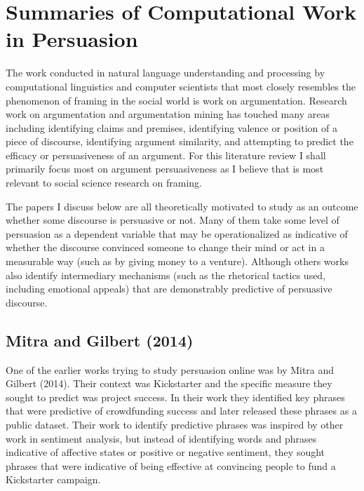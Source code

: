 \documentclass[11pt,a4paper]{article}
\begin{document}
\section{Summaries of Computational Work in Persuasion}

The work conducted in natural language understanding and processing by computational linguistics and computer scientists that most closely resembles the phenomenon of framing in the social world is work on argumentation. Research work on argumentation and argumentation mining has touched many areas including identifying claims and premises, identifying valence or position of a piece of discourse, identifying argument similarity, and attempting to predict the efficacy or persuasiveness of an argument. For this literature review I shall primarily focus most on argument persuasiveness as I believe that is most relevant to social science research on framing. 

The papers I discuss below are all theoretically motivated to study as an outcome whether some discourse is persuasive or not. Many of them take some level of persuasion as a dependent variable that may be operationalized as indicative of whether the discourse convinced someone to change their mind or act in a measurable way (such as by giving money to a venture). Although others works also identify intermediary mechanisms (such as the rhetorical tactics used, including emotional appeals) that are demonstrably predictive of persuasive discourse.





\subsection{Mitra and Gilbert (2014)}
One of the earlier  works trying to study persuasion online was by Mitra and Gilbert (2014). Their context was Kickstarter and the specific measure they sought to predict was project success. In their work they identified key phrases that were predictive of crowdfunding success and later released these phrases as a public dataset. Their work to identify predictive phrases was inspired by other work in sentiment analysis, but instead of identifying words and phrases indicative of affective states or positive or negative sentiment, they sought phrases that were indicative of being effective at convincing people to fund a Kickstarter campaign.
\end{document}
